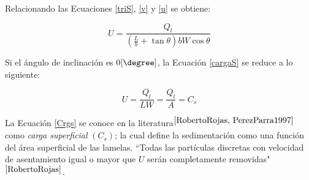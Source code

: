 \noindent
\justify

Relacionando las Ecuaciones \ref{triS}, \ref{v} y \ref{u} se obtiene:

\begin{equation}
	\boxed{U = \frac{Q_l}{\left(\frac{L}{b} +  \tan \theta \right) b W \cos \theta } }
	\label{cargaS}
\end{equation}

\noindent
\justify

Si el \'angulo de inclinaci\'on es $0 [\degree]$, la Ecuaci\'on \ref{cargaS} se reduce a lo siguiente:

\begin{equation}
	U = \frac{Q_l}{L W} = \frac{Q_l}{A} = C_s
	\label{Crgs}
\end{equation}

\noindent
\justify

La Ecuaci\'on \ref{Crgs} se conoce en la literatura$^{\cite{RobertoRojas, PerezParra1997}}$ como \textit{carga superficial} $(C_s)$; la cual define la sedimentaci\'on como una funci\'on del \'area superficial de las lamelas. ``Todas las part\'iculas discretas con velocidad de asentamiento igual o mayor que $U$ ser\'an completamente removidas"$^{\cite{RobertoRojas}}$.
